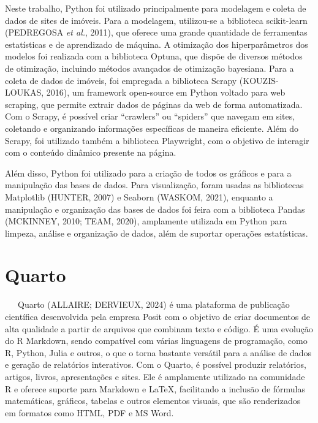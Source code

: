 \documentclass[
  12pt,
  a4paper,
]{scrreprt}
\begin{document}
Neste trabalho, Python foi utilizado principalmente para modelagem e
coleta de dados de sites de imóveis. Para a modelagem, utilizou-se a
biblioteca scikit-learn (PEDREGOSA \emph{et al.}, 2011), que oferece uma
grande quantidade de ferramentas estatísticas e de aprendizado de
máquina. A otimização dos hiperparâmetros dos modelos foi realizada com
a biblioteca Optuna, que dispõe de diversos métodos de otimização,
incluindo métodos avançados de otimização bayesiana. Para a coleta de
dados de imóveis, foi empregada a biblioteca Scrapy (KOUZIS-LOUKAS,
2016), um framework open-source em Python voltado para web scraping, que
permite extrair dados de páginas da web de forma automatizada. Com o
Scrapy, é possível criar ``crawlers'' ou ``spiders'' que navegam em
sites, coletando e organizando informações específicas de maneira
eficiente. Além do Scrapy, foi utilizado também a biblioteca Playwright,
com o objetivo de interagir com o conteúdo dinâmico presente na página.

\vspace{12pt}

Além disso, Python foi utilizado para a criação de todos os gráficos e
para a manipulação das bases de dados. Para visualização, foram usadas
as bibliotecas Matplotlib (HUNTER, 2007) e Seaborn (WASKOM, 2021),
enquanto a manipulação e organização das bases de dados foi feira com a
biblioteca Pandas (MCKINNEY, 2010; TEAM, 2020), amplamente utilizada em
Python para limpeza, análise e organização de dados, além de suportar
operações estatísticas.

\section{Quarto}\label{quarto}

~~~Quarto (ALLAIRE; DERVIEUX, 2024) é uma plataforma de publicação
científica desenvolvida pela empresa Posit com o objetivo de criar
documentos de alta qualidade a partir de arquivos que combinam texto e
código. É uma evolução do R Markdown, sendo compatível com várias
linguagens de programação, como R, Python, Julia e outros, o que o torna
bastante versátil para a análise de dados e geração de relatórios
interativos. Com o Quarto, é possível produzir relatórios, artigos,
livros, apresentações e sites. Ele é amplamente utilizado na comunidade
R e oferece suporte para Markdown e \LaTeX, facilitando a inclusão de
fórmulas matemáticas, gráficos, tabelas e outros elementos visuais, que
são renderizados em formatos como HTML, PDF e MS Word.
\end{document}
